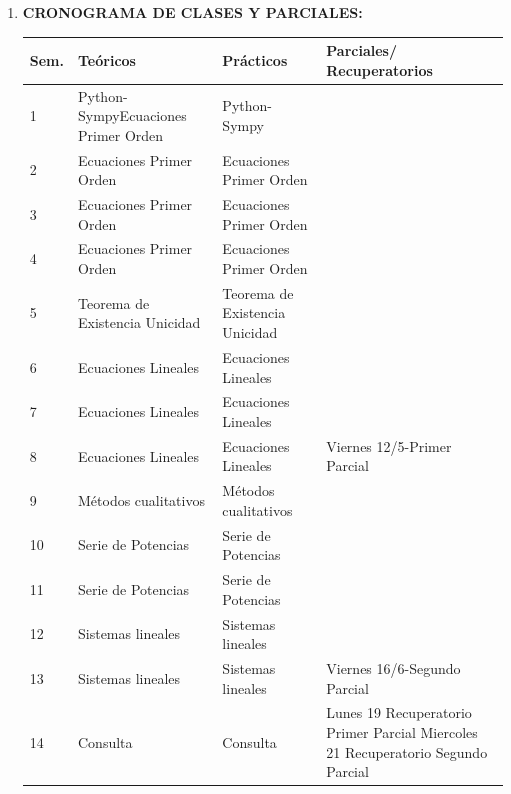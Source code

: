 \documentclass[12pt]{article}
\begin{document}
\begin{enumerate}
\item\textbf{CRONOGRAMA DE CLASES Y PARCIALES:}
\begin{table}[h]
\begin{tabular}{|m{0.6cm} |m{5cm}|m{5cm}|m{4.8cm}|}\hline
Sem.  & Teóricos & Prácticos & Parciales/ Recuperatorios\\\hline \hline
1   & Python-Sympy\newline Ecuaciones Primer Orden  &  Python-Sympy &   \\ \hline
  2 &  Ecuaciones Primer Orden  & Ecuaciones Primer Orden  &   \\ \hline
  3 &  Ecuaciones Primer Orden    &  Ecuaciones Primer Orden &   \\ \hline
   4 &  Ecuaciones Primer Orden    &  Ecuaciones Primer Orden &   \\ \hline
  5 & Teorema de Existencia Unicidad  &  Teorema de Existencia Unicidad   &   \\ \hline
  6 &   Ecuaciones Lineales   &  Ecuaciones Lineales   &   \\ \hline
  7 &  Ecuaciones Lineales   &  Ecuaciones Lineales &   \\ \hline

  8& Ecuaciones Lineales   &  Ecuaciones Lineales &  Viernes 12/5-Primer Parcial  \\ \hline

  9 & Métodos cualitativos & Métodos cualitativos   &   \\ \hline
  10 & Serie de Potencias  & Serie de Potencias  &   \\ \hline
  11 & Serie de Potencias   & Serie de Potencias  &   \\ \hline
  12 & Sistemas lineales  & Sistemas lineales  &   \\ \hline
  13 & Sistemas lineales & Sistemas lineales  &  Viernes 16/6-Segundo Parcial \\ \hline
  14  & Consulta & Consulta &  Lunes 19 Recuperatorio Primer Parcial\newline
  Miercoles 21 Recuperatorio Segundo Parcial \\ \hline

\end{tabular}
\end{table}

\end{enumerate}
















%
%
  
  
\end{document}
